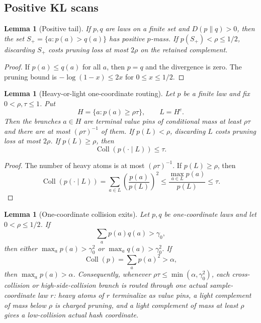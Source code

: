 \documentclass[11pt]{article}
\newtheorem{lemma}[theorem]{Lemma}
\theoremstyle{remark}
\newcommand{\Coll}{\operatorname{Coll}}
\begin{document}
\subsection{Positive KL scans}

\begin{lemma}[Positive tail]\label{lem:positive-tail}
If $p,q$ are laws on a finite set and $D(p\|q)>0$, then the set $S_+=\{a:p(a)>q(a)\}$ has positive $p$-mass.  If $p(S_+)<\rho\le1/2$, discarding $S_+$ costs pruning loss at most $2\rho$ on the retained complement.
\end{lemma}

\begin{proof}
If $p(a)\le q(a)$ for all $a$, then $p=q$ and the divergence is zero.  The pruning bound is $-\log(1-x)\le 2x$ for $0\le x\le1/2$.
\end{proof}

\begin{lemma}[Heavy-or-light one-coordinate routing]\label{lem:heavy-light}
Let $p$ be a finite law and fix $0<\rho,\tau\le1$.  Put
\[
        H=\{a:p(a)\ge \rho\tau\},\qquad L=H^c.
\]
Then the branches $a\in H$ are terminal value pins of conditional mass at least $\rho\tau$ and there are at most $(\rho\tau)^{-1}$ of them.  If $p(L)<\rho$, discarding $L$ costs pruning loss at most $2\rho$.  If $p(L)\ge\rho$, then
\[
        \Coll(p(\cdot\mid L))\le \tau.
\]
\end{lemma}

\begin{proof}
The number of heavy atoms is at most $(\rho\tau)^{-1}$.  If $p(L)\ge\rho$, then
\[
        \Coll(p(\cdot\mid L))=\sum_{a\in L}\left(\frac{p(a)}{p(L)}\right)^2
        \le \frac{\max_{a\in L}p(a)}{p(L)}\le \tau.
\]
\end{proof}


\begin{lemma}[One-coordinate collision exits]\label{lem:collision-exit}
Let $p,q$ be one-coordinate laws and let $0<\rho\le 1/2$.  If
\[
        \sum_a p(a)q(a)>\gamma_0,
\]
then either $\max_a p(a)>\gamma_0^2$ or $\max_a q(a)>\gamma_0^2$.  If
\[
        \Coll(p)=\sum_a p(a)^2>\alpha,
\]
then $\max_a p(a)>\alpha$.  Consequently, whenever $\rho\tau\le\min(\alpha,\gamma_0^2)$, each cross-collision or high-side-collision branch is routed through one actual sample-coordinate law $r$: heavy atoms of $r$ terminalize as value pins, a light complement of mass below $\rho$ is charged pruning, and a light complement of mass at least $\rho$ gives a low-collision actual hash coordinate.
\end{lemma}
\end{document}

